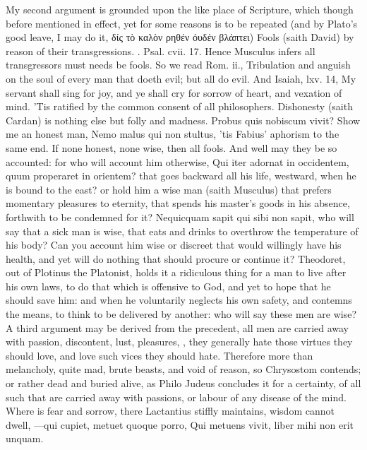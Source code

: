 {My second argument is grounded upon the like place of Scripture, which
though before mentioned in effect, yet for some reasons is to be
repeated (and by Plato's good leave, I may do it, δίς τὸ καλὸν
ρηθέν ὀυδέν βλάπτει) Fools (saith David) by reason of their
transgressions. \etc{}. Psal. cvii. 17. Hence Musculus infers all
transgressors must needs be fools. So we read Rom. ii., Tribulation and
anguish on the soul of every man that doeth evil; but all do evil. And
Isaiah, lxv. 14, My servant shall sing for joy, and ye shall cry
for sorrow of heart, and vexation of mind. 'Tis ratified by the common
consent of all philosophers. Dishonesty (saith Cardan) is nothing else
but folly and madness.  Probus quis nobiscum vivit? Show me an
honest man, Nemo malus qui non stultus, 'tis Fabius' aphorism to the
same end. If none honest, none wise, then all fools. And well may they
be so accounted: for who will account him otherwise, Qui iter adornat
in occidentem, quum properaret in orientem? that goes backward all his
life, westward, when he is bound to the east? or hold him a wise man
(saith Musculus) that prefers momentary pleasures to eternity,
that spends his master's goods in his absence, forthwith to be
condemned for it? Nequicquam sapit qui sibi non sapit, who will say
that a sick man is wise, that eats and drinks to overthrow the
temperature of his body? Can you account him wise or discreet that
would willingly have his health, and yet will do nothing that should
procure or continue it? Theodoret, out of Plotinus the Platonist,
holds it a ridiculous thing for a man to live after his own laws, to do
that which is offensive to God, and yet to hope that he should save
him: and when he voluntarily neglects his own safety, and contemns the
means, to think to be delivered by another: who will say these men are
wise?
A third argument may be derived from the precedent, all men are
carried away with passion, discontent, lust, pleasures, \etc{}, they
generally hate those virtues they should love, and love such vices they
should hate. Therefore more than melancholy, quite mad, brute beasts,
and void of reason, so Chrysostom contends; or rather dead and buried
alive, as  Philo Judeus concludes it for a certainty, of all such
that are carried away with passions, or labour of any disease of the
mind. Where is fear and sorrow, there Lactantius stiffly
maintains, wisdom cannot dwell,
---qui cupiet, metuet quoque porro,
Qui metuens vivit, liber mihi non erit unquam.

}
